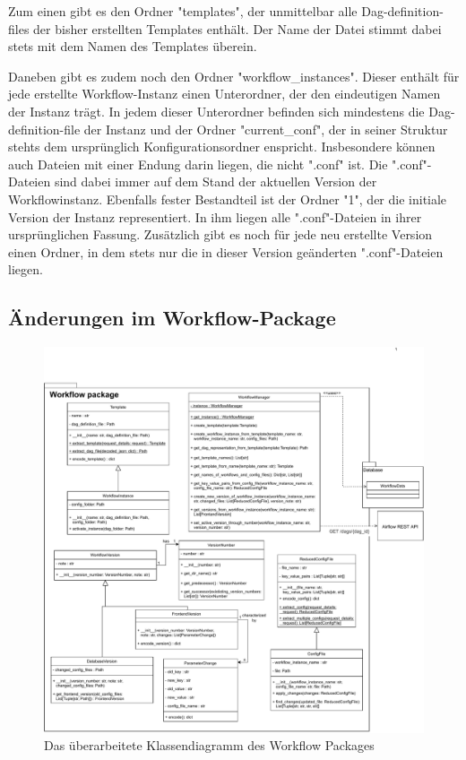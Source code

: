 Zum einen gibt es den Ordner "templates", der unmittelbar alle Dag-definition-files der bisher erstellten Templates enthält. Der Name der Datei stimmt dabei stets mit dem Namen des Templates überein. 

Daneben gibt es zudem noch den Ordner "workflow\_instances". Dieser enthält für jede erstellte Workflow-Instanz einen Unterordner, der den eindeutigen Namen der Instanz trägt. In jedem dieser Unterordner befinden sich mindestens die Dag-definition-file der Instanz und der Ordner "current\_conf", der in seiner Struktur stehts dem ursprünglich Konfigurationsordner enspricht. Insbesondere können auch Dateien mit einer Endung darin liegen, die nicht ".conf" ist. Die ".conf"-Dateien sind dabei immer auf dem Stand der aktuellen Version der Workflowinstanz. Ebenfalls fester Bestandteil ist der Ordner "1", der die initiale Version der Instanz representiert. In ihm liegen alle ".conf"-Dateien in ihrer ursprünglichen Fassung. Zusätzlich gibt es noch für jede neu erstellte Version einen Ordner, in dem stets nur die in dieser Version geänderten ".conf"-Dateien liegen.

\subsection{Änderungen im Workflow-Package}

\begin{figure}[h]
            \label{workflow_klassen}
            \centerline{\includegraphics[scale=0.5]{res/workflow_class_diag.pdf}}
            \caption{Das überarbeitete Klassendiagramm des Workflow Packages}
\end{figure}